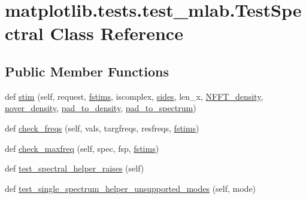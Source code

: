 \hypertarget{classmatplotlib_1_1tests_1_1test__mlab_1_1TestSpectral}{}\section{matplotlib.\+tests.\+test\+\_\+mlab.\+Test\+Spectral Class Reference}
\label{classmatplotlib_1_1tests_1_1test__mlab_1_1TestSpectral}
\subsection*{Public Member Functions}
\begin{DoxyCompactItemize}
\item 
def \hyperlink{classmatplotlib_1_1tests_1_1test__mlab_1_1TestSpectral_adac83b8b1f24cc624f0402716a6782bb}{stim} (self, request, \hyperlink{classmatplotlib_1_1tests_1_1test__mlab_1_1TestSpectral_ad54522330d900fa91085fda1f8b7f883}{fstims}, iscomplex, \hyperlink{classmatplotlib_1_1tests_1_1test__mlab_1_1TestSpectral_aa667437fbbd3fd347707967e23c6fd5a}{sides}, len\+\_\+x, \hyperlink{classmatplotlib_1_1tests_1_1test__mlab_1_1TestSpectral_a6c106f0bf8d06bd7e46b62ef442afc23}{N\+F\+F\+T\+\_\+density}, \hyperlink{classmatplotlib_1_1tests_1_1test__mlab_1_1TestSpectral_a41f367a74893cc2fdc90a6ace9833b5c}{nover\+\_\+density}, \hyperlink{classmatplotlib_1_1tests_1_1test__mlab_1_1TestSpectral_a3c6983a25874f8b0df459756bd37f021}{pad\+\_\+to\+\_\+density}, \hyperlink{classmatplotlib_1_1tests_1_1test__mlab_1_1TestSpectral_aca26488f60c6748446bd05c6f910ada6}{pad\+\_\+to\+\_\+spectrum})
\item 
def \hyperlink{classmatplotlib_1_1tests_1_1test__mlab_1_1TestSpectral_a8469a31b01665bb78001a3b8f2f372c6}{check\+\_\+freqs} (self, vals, targfreqs, resfreqs, \hyperlink{classmatplotlib_1_1tests_1_1test__mlab_1_1TestSpectral_ad54522330d900fa91085fda1f8b7f883}{fstims})
\item 
def \hyperlink{classmatplotlib_1_1tests_1_1test__mlab_1_1TestSpectral_a796b9aca5d0e1e5a407da8d59479071e}{check\+\_\+maxfreq} (self, spec, fsp, \hyperlink{classmatplotlib_1_1tests_1_1test__mlab_1_1TestSpectral_ad54522330d900fa91085fda1f8b7f883}{fstims})
\item 
def \hyperlink{classmatplotlib_1_1tests_1_1test__mlab_1_1TestSpectral_a5df0c4ca1adec677c6b720089d18402b}{test\+\_\+spectral\+\_\+helper\+\_\+raises} (self)
\item 
def \hyperlink{classmatplotlib_1_1tests_1_1test__mlab_1_1TestSpectral_a04e0c6a656ba6716f3cb7eba9f260220}{test\+\_\+single\+\_\+spectrum\+\_\+helper\+\_\+unsupported\+\_\+modes} (self, mode)

\end{DoxyCompactItemize}
